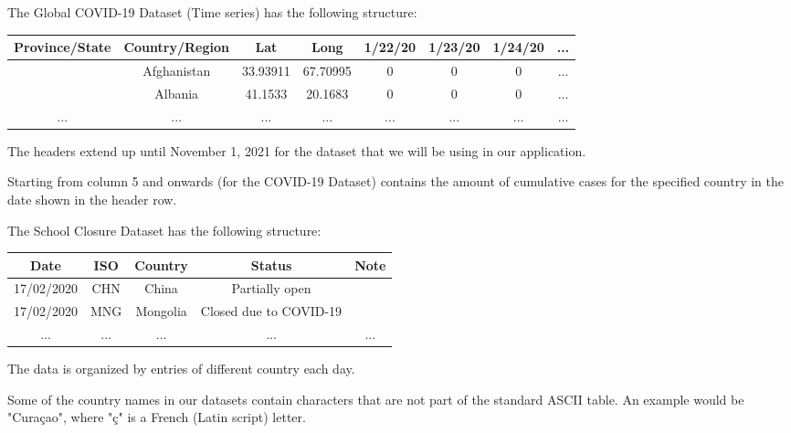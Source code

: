 \documentclass[fontsize=11pt]{article}
\begin{document}
    The Global COVID-19 Dataset (Time series) has the following structure:

    \begin{center}
        \begin{tabular}{ |c|c|c|c|c|c|c|c| }
            \hline
            Province/State & Country/Region & Lat      & Long     & 1/22/20 & 1/23/20 & 1/24/20 & ... \\
            \hline
            & Afghanistan    & 33.93911 & 67.70995 & 0       & 0       & 0       & ... \\
            \hline
            & Albania        & 41.1533  & 20.1683  & 0       & 0       & 0       & ... \\
            \hline
            ...            & ...            & ...      & ...      & ...     & ...     & ...     & ... \\
            \hline
        \end{tabular}
    \end{center}

    The headers extend up until November 1, 2021 for the dataset that we will be using in our application.

    Starting from column 5 and onwards (for the COVID-19 Dataset) contains the amount of cumulative cases for the specified country in the date shown in the header row.

    The School Closure Dataset has the following structure:
    \begin{center}
        \begin{tabular}{ |c|c|c|c|c| }
            \hline
            Date       & ISO & Country  & Status                  & Note\\
            \hline
            17/02/2020 & CHN & China    & Partially open          & \\
            \hline
            17/02/2020 & MNG & Mongolia & Closed due to COVID-19  & \\
            \hline
            ...        & ... & ...      & ...                     & ...\\
            \hline
        \end{tabular}
    \end{center}

    The data is organized by entries of different country each day.

    Some of the country names in our datasets contain characters that are not part of the standard ASCII table. An example would be "Cura\c{c}ao", where "\c{c}" is a French (Latin script) letter.
\end{document}
